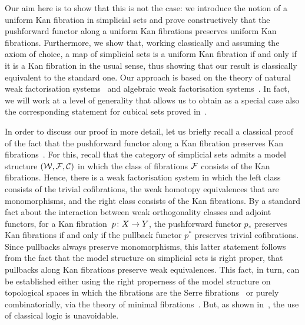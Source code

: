 \documentclass[reqno,10pt,a4paper,oneside]{amsart}
\begin{document}
Our aim here is to show that this is not the case: we introduce the notion of a uniform Kan fibration in simplicial sets and prove constructively that the pushforward functor along a uniform Kan fibrations preserves uniform Kan fibrations. Furthermore, we show that, working classically and assuming the axiom of choice, a map of simplicial sets is a uniform Kan fibration if and only if it is a Kan fibration in the usual sense, thus showing that our result is classically equivalent to the standard one. Our approach is based on the theory of natural weak factorisation systems~\cite{grandis-tholen-nwfs} and algebraic weak factorisation systems~\cite{garner:small-object-argument}. In fact, we will work at a level of generality that allows us to obtain as a special case also the corresponding statement for cubical sets proved in~\cite{coquand-variation}.

In order to discuss our proof in more detail, let us briefly recall a classical proof of the fact that the pushforward functor along a Kan fibration preserves Kan fibrations~\cite[Lemma~2.3.1]{voevodsky-simplicial-model}. For this, recall that the category of simplicial sets admits a model structure $(\cal{W}, \cal{F}, \cal{C})$ in which the class of fibrations $\cal{F}$ consists of the Kan fibrations. Hence, there is a  weak factorisation system in which the left class consists  of the trivial cofibrations, \ie the weak homotopy equivalences that are monomorphisms, and the right class consists of the Kan fibrations. By a standard fact about the interaction between weak orthogonality classes and adjoint functors, for a Kan fibration~$p \co X \to Y$, the 
 pushforward functor $p_*$ preserves Kan fibrations if and only if 
 the pullback functor $p^*$  preserves trivial cofibrations. Since pullbacks always preserve monomorphisms, 
  this latter statement follows from the fact that the model structure on simplicial sets is right proper, \ie that pullbacks along Kan fibrations preserve weak equivalences. This fact, in turn, can be established either using the right properness of the model structure on topological spaces in which
  the fibrations are the Serre fibrations~\cite[Theorem~13.1.13]{hirschhorn-model-localizations} or purely combinatorially, via the theory of minimal fibrations~\cite[Theorem~1.7.1]{joyal-tierney-notes}. But, as shown in~\cite{coquand-non-constructivity-kan}, the use of classical logic is unavoidable. 

\medskip
\end{document}

